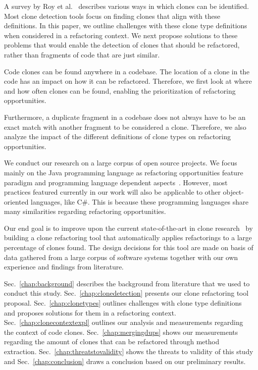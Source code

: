 \documentclass[a4paper]{article}
\begin{document}
A survey by Roy et al.~\cite{roy2007survey} describes various ways in which clones can be identified. Most clone detection tools focus on finding clones that align with these definitions. In this paper, we outline challenges with these clone type definitions when considered in a refactoring context. We next propose solutions to these problems that would enable the detection of clones that should be refactored, rather than fragments of code that are just similar.

Code clones can be found anywhere in a codebase. The location of a clone in the code has an impact on how it can be refactored. Therefore, we first look at where and how often clones can be found, enabling the prioritization of refactoring opportunities.

Furthermore, a duplicate fragment in a codebase does not always have to be an exact match with another fragment to be considered a clone. Therefore, we also analyze the impact of the different definitions of clone types on refactoring opportunities.

We conduct our research on a large corpus of open source projects. We focus mainly on the Java programming language as refactoring opportunities feature paradigm and programming language dependent aspects~\cite{choi2011extracting}. However, most practices featured currently in our work will also be applicable to other object-oriented languages, like C\#. This is because these programming languages share many similarities regarding refactoring opportunities.

Our end goal is to improve upon the current state-of-the-art in clone research~\cite{fontana2015duplicated, alwaqfi2017refactoring} by building a clone refactoring tool that automatically applies refactorings to a large percentage of clones found. The design decisions for this tool are made on basis of data gathered from a large corpus of software systems together with our own experience and findings from literature.

Sec.~\ref{chap:background} describes the background from literature that we used to conduct this study. Sec.~\ref{chap:clonedetection} presents our clone refactoring tool proposal. Sec.~\ref{chap:clonetypes} outlines challenges with clone type definitions and proposes solutions for them in a refactoring context. Sec.~\ref{chap:clonecontextexpl} outlines our analysis and measurements regarding the context of code clones. Sec.~\ref{chap:mergingdups} shows our measurements regarding the amount of clones that can be refactored through method extraction. Sec.~\ref{chap:threatstovalidity} shows the threats to validity of this study and Sec.~\ref{chap:conclusion} draws a conclusion based on our preliminary results.
\end{document}
